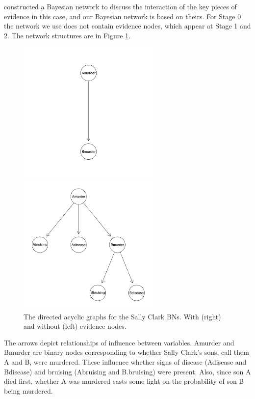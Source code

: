 \documentclass[10pt,]{scrartcl}
\begin{document}
\citet{Fenton2018Risk} constructed a Bayesian network to discuss the interaction of the key pieces of evidence in this case, and our Bayesian network is based on theirs. For Stage 0 the network we use does not contain evidence nodes, which appear at Stage 1 and 2.  The network structures are in Figure \ref{fig:sc}.


\begin{figure}[H]
\begin{minipage}{.4\textwidth} %
    \includegraphics[width = 7cm]{../images/scStage0DAG.png}\end{minipage} %
\begin{minipage}{.5\textwidth} %
    \includegraphics[width = 7cm]{../images/scFullDAG.png}
\end{minipage}
    \caption{The directed acyclic graphs for the Sally Clark BNs. With (right) and without (left) evidence nodes.}
    \label{fig:sc}
\end{figure}



The  arrows  depict  relationships  of  influence  between  variables. \textsf{Amurder} and \textsf{Bmurder} are binary nodes corresponding to whether Sally  Clark’s  sons,   call  them A and B, were murdered. These  influence  whether  signs of disease (\textsf{Adisease} and \textsf{Bdisease}) and bruising (\textsf{Abruising} and \textsf{B.bruising}) were present. Also, since  son A died first, whether A was murdered casts some light on the probability of son B being murdered.
\end{document}
